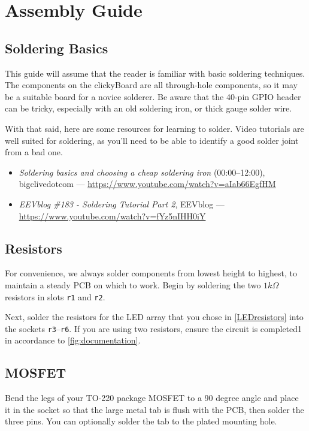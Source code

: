 \documentclass[10pt, a4paper, onesided]{article}
\begin{document}
\newpage
\section{Assembly Guide}

	\subsection*{Soldering Basics}
		This guide will assume that the reader is familiar with basic soldering techniques. The components on the clickyBoard are all through-hole components, so it may be a suitable board for a novice solderer. Be aware that the 40-pin GPIO header can be tricky, especially with an old soldering iron, or thick gauge solder wire.
		
		With that said, here are some resources for learning to solder. Video tutorials are well suited for soldering, as you'll need to be able to identify a good solder joint from a bad one.
		\begin{itemize}[nolistsep]
			\item \textit{Soldering basics and choosing a cheap soldering iron} (00:00--12:00), bigclivedotcom --- \url{https://www.youtube.com/watch?v=aIab66EgfHM}
			\item \textit{EEVblog \#183 - Soldering Tutorial Part 2}, EEVblog --- \url{https://www.youtube.com/watch?v=fYz5nIHH0iY}
		\end{itemize}
	
	\subsection*{Resistors}
	
		For convenience, we always solder components from lowest height to highest, to maintain a steady PCB on which to work. Begin by soldering the two $1 k\Omega$ resistors in slots \texttt{r1} and \texttt{r2}.
		
		Next, solder the resistors for the LED array that you chose in \autoref{LEDresistors} into the sockets \texttt{r3}--\texttt{r6}. If you are using two resistors, ensure the circuit is completed1 in accordance to \autoref*{fig:documentation}.
	
	\subsection*{MOSFET}
	
		Bend the legs of your TO-220 package MOSFET to a 90 degree angle and place it in the socket so that the large metal tab is flush with the PCB, then solder the three pins. You can optionally solder the tab to the plated mounting hole.
		
\end{document}
